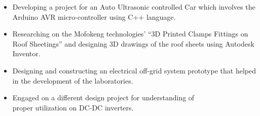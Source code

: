 \documentclass[10pt,a4paper,ragged2e]{altacv}
\begin{document}
\begin{itemize}

\item Developing a project for an Auto Ultrasonic controlled Car which involves the Arduino AVR micro-controller using C++ language.
\item Researching on the Mofokeng technologies' ``3D Printed Clamps Fittings on Roof Sheetings'' and designing 3D drawings of the roof sheets using Autodesk Inventor.

\end{itemize}


\divider



\begin{itemize}
\item Designing and constructing an electrical off-grid system prototype that helped in the development of the laboratories.
\item Engaged on a different design project for understanding of\\ proper utilization on DC-DC inverters.
\end{itemize}


\end{document}
